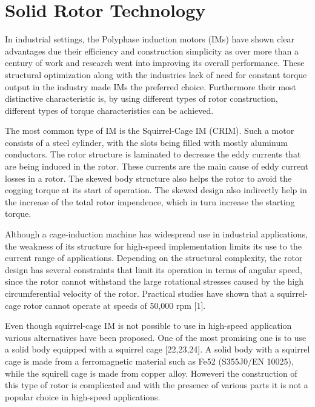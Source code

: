 
\chapter{Solid Rotor Technology}
\label{chap:Solid-Rotor-Technology}


In industrial settings, the Polyphase induction motors (IMs) have shown clear advantages due
their efficiency and construction simplicity as over more than a century of work and research
went into improving its overall performance. These structural optimization along with the
industries lack of need for constant torque output in the industry made IMs the preferred
choice.  Furthermore their most distinctive characteristic is, by using different types of
rotor construction, different types of torque characteristics can be achieved.

The most common type of IM is the Squirrel-Cage IM (CRIM). Such a motor consists of a steel
cylinder, with the slots being filled with mostly aluminum conductors. The rotor structure is
laminated to decrease the eddy currents that are being induced in the rotor. These currents are
the main cause of eddy current losses in a rotor. The skewed body structure also helps the
rotor to avoid the cogging torque at its start of operation. The skewed design also indirectly
help in the increase of the total rotor impendence, which in turn increase the starting torque.


Although a cage-induction machine has widespread use in industrial applications, the weakness
of its structure for high-speed implementation limits its use to the current range of
applications. Depending on the structural complexity, the rotor design has several constraints
that limit its operation in terms of angular speed, since the rotor cannot withstand the large
rotational stresses caused by the high circumferential velocity of the rotor. Practical studies
have shown that a squirrel- cage rotor cannot operate at speeds of 50,000 rpm [1].

Even though squirrel-cage IM is not possible to use in high-speed application various
alternatives have been proposed. One of the most promising one is to use a solid body equipped
with a squirrel cage [22,23,24]. A solid body with a squirrel cage is made from a ferromagnetic
material such as Fe52 (S355J0/EN 10025), while the squirell cage is made from copper
alloy. Howeveri the construction of this type of rotor is complicated and with the presence of
various parts it is not a popular choice in high-speed applications.

